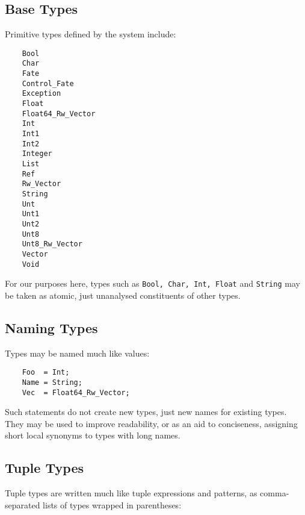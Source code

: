 \cutend*

\subsection{Base Types}
\label{section:ref:types:base-types}

Primitive types defined by the system include:

\begin{verbatim}
    Bool
    Char
    Fate
    Control_Fate
    Exception
    Float
    Float64_Rw_Vector
    Int
    Int1
    Int2
    Integer
    List
    Ref
    Rw_Vector
    String
    Unt
    Unt1
    Unt2
    Unt8
    Unt8_Rw_Vector
    Vector
    Void
\end{verbatim}

For our purposes here, types such as {\tt Bool, Char, Int, Float} and {\tt String} 
may be taken as atomic, just unanalysed constituents of other types.

\cutend*

\subsection{Naming Types}
\label{section:ref:types:naming-types}

Types may be named much like values:

\begin{verbatim}
    Foo  = Int;
    Name = String;
    Vec  = Float64_Rw_Vector;
\end{verbatim}

Such statements do not create new types, just new names 
for existing types.  They may be used to improve readability, 
or as an aid to conciseness, assigning short local synonyms 
to types with long names.

\cutend*


\subsection{Tuple Types}
\label{section:ref:types:tuple-types}

Tuple types are written much like tuple expressions 
and patterns, as comma-separated lists of types 
wrapped in parentheses:

